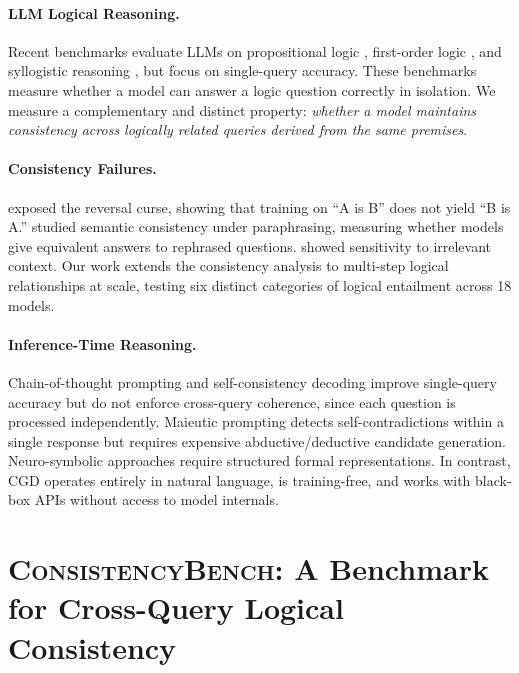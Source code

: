 \documentclass{article}
\newcommand{\bench}{\textsc{ConsistencyBench}}
\newcommand{\method}{\textsc{CGD}}
\begin{document}
\paragraph{LLM Logical Reasoning.}
Recent benchmarks evaluate LLMs on propositional logic \citep{saparov2023language}, first-order logic \citep{han2022folio}, and syllogistic reasoning \citep{dasgupta2022language}, but focus on single-query accuracy. These benchmarks measure whether a model can answer a logic question correctly in isolation. We measure a complementary and distinct property: \emph{whether a model maintains consistency across logically related queries derived from the same premises}.

\paragraph{Consistency Failures.}
\citet{berglund2023reversal} exposed the reversal curse, showing that training on ``A is B'' does not yield ``B is A.'' \citet{raj2023semantic} studied semantic consistency under paraphrasing, measuring whether models give equivalent answers to rephrased questions. \citet{shi2023large} showed sensitivity to irrelevant context. Our work extends the consistency analysis to multi-step logical relationships at scale, testing six distinct categories of logical entailment across 18 models.

\paragraph{Inference-Time Reasoning.}
Chain-of-thought prompting \citep{wei2022chain} and self-consistency decoding \citep{wang2023selfconsistency} improve single-query accuracy but do not enforce cross-query coherence, since each question is processed independently. Maieutic prompting \citep{jung2022maieutic} detects self-contradictions within a single response but requires expensive abductive/deductive candidate generation. Neuro-symbolic approaches \citep{pan2023logic, xu2024symbcot} require structured formal representations. In contrast, \method{} operates entirely in natural language, is training-free, and works with black-box APIs without access to model internals.

\section{\bench{}: A Benchmark for Cross-Query Logical Consistency}
\label{sec:benchmark}
\end{document}
